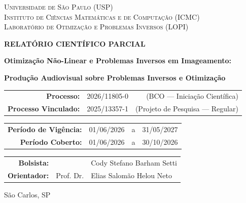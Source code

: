 \documentclass[a4paper]{article}
\begin{document}
\begin{titlepage}
	\centering
	{\scshape
		Universidade de São Paulo (USP)                          \\[0.2\baselineskip]
		Instituto de Ciências Matemáticas e de Computação (ICMC) \\[1.0\baselineskip]
		\large Laboratório de Otimização e Problemas Inversos (LOPI)
	}

	\vspace{8\baselineskip}

	{\bfseries\LARGE RELATÓRIO CIENTÍFICO PARCIAL}

	\vspace{4\baselineskip}

	{\bfseries\large Otimização Não-Linear e Problemas Inversos em Imageamento:}

	\vspace{.3\baselineskip}

	{\bfseries\Large Produção Audiovisual sobre Problemas Inversos e Otimização}

	\vspace{1.5\baselineskip}

	{\large
		\begin{tabular}{rlr}
			\textbf{Processo:}          & 2026/11805-0 & (BCO --- Iniciação Científica)    \\[.5em]
			\textbf{Processo Vinculado:} & 2025/13357-1 & (Projeto de Pesquisa --- Regular)
		\end{tabular}
	}

	\vspace{5\baselineskip}

	\begin{tabular}{rccc}
		\textbf{Período de Vigência:} & 01/06/2026 & a & 31/05/2027 \\[.5em]
		\textbf{Período Coberto:}     & 01/06/2026 & a & 30/10/2026
	\end{tabular}

	\vfill

	\begin{tabular}{rcl}
		\textbf{Bolsista:}   &           & Cody Stefano Barham Setti \\[.5em]
		\textbf{Orientador:} & Prof. Dr. & Elias Salomão Helou Neto
	\end{tabular}

	\vspace{8\baselineskip}

	{\large São Carlos, SP}
\end{titlepage}
\end{document}
